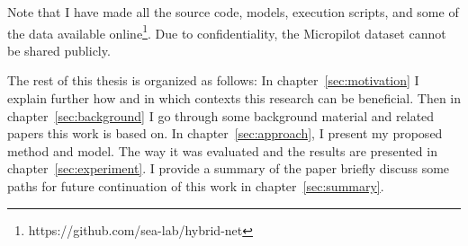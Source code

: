 Note that I have made all the source code, models, execution scripts, and some of the data available online\footnote{https://github.com/sea-lab/hybrid-net}. Due to confidentiality, the Micropilot dataset cannot be shared publicly. 

The rest of this thesis is organized as follows: In chapter~\ref{sec:motivation} I explain further how and in which contexts this research can be beneficial. 
Then in chapter~\ref{sec:background} I go through some background material and related papers this work is based on. 
In chapter~\ref{sec:approach}, I present my proposed method and model. The way it was evaluated and the results are presented in chapter~\ref{sec:experiment}. 
I provide a summary of the paper briefly discuss some paths for future continuation of this work in chapter~\ref{sec:summary}.
